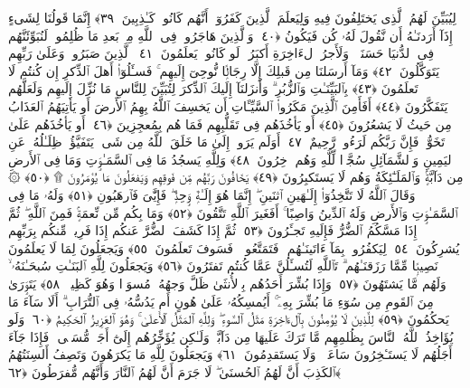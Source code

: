  لِيُبَيِّنَ لَهُمُ ٱلَّذِى يَختَلِفُونَ فِيهِ وَلِيَعلَمَ ٱلَّذِينَ كَفَرُوٓا۟ أَنَّهُم كَانُوا۟ كَـٰذِبِينَ ﴿٣٩﴾
 إِنَّمَا قَولُنَا لِشَىءٍ إِذَآ أَرَدنَـٰهُ أَن نَّقُولَ لَهُۥ كُن فَيَكُونُ ﴿٤٠﴾
 وَٱلَّذِينَ هَاجَرُوا۟ فِى ٱللَّهِ مِنۢ بَعدِ مَا ظُلِمُوا۟ لَنُبَوِّئَنَّهُم فِى ٱلدُّنيَا حَسَنَةًۭ ۖ وَلَأَجرُ ٱلءَاخِرَةِ أَكبَرُ ۚ لَو كَانُوا۟ يَعلَمُونَ ﴿٤١﴾
 ٱلَّذِينَ صَبَرُوا۟ وَعَلَىٰ رَبِّهِم يَتَوَكَّلُونَ ﴿٤٢﴾
 وَمَآ أَرسَلنَا مِن قَبلِكَ إِلَّا رِجَالًۭا نُّوحِىٓ إِلَيهِم ۚ فَسـَٔلُوٓا۟ أَهلَ ٱلذِّكرِ إِن كُنتُم لَا تَعلَمُونَ ﴿٤٣﴾
 بِٱلبَيِّنَـٰتِ وَٱلزُّبُرِ ۗ وَأَنزَلنَآ إِلَيكَ ٱلذِّكرَ لِتُبَيِّنَ لِلنَّاسِ مَا نُزِّلَ إِلَيهِم وَلَعَلَّهُم يَتَفَكَّرُونَ ﴿٤٤﴾
 أَفَأَمِنَ ٱلَّذِينَ مَكَرُوا۟ ٱلسَّيِّـَٔاتِ أَن يَخسِفَ ٱللَّهُ بِهِمُ ٱلأَرضَ أَو يَأتِيَهُمُ ٱلعَذَابُ مِن حَيثُ لَا يَشعُرُونَ ﴿٤٥﴾
 أَو يَأخُذَهُم فِى تَقَلُّبِهِم فَمَا هُم بِمُعجِزِينَ ﴿٤٦﴾
 أَو يَأخُذَهُم عَلَىٰ تَخَوُّفٍۢ فَإِنَّ رَبَّكُم لَرَءُوفٌۭ رَّحِيمٌ ﴿٤٧﴾
 أَوَلَم يَرَوا۟ إِلَىٰ مَا خَلَقَ ٱللَّهُ مِن شَىءٍۢ يَتَفَيَّؤُا۟ ظِلَـٰلُهُۥ عَنِ ٱليَمِينِ وَٱلشَّمَآئِلِ سُجَّدًۭا لِّلَّهِ وَهُم دَٟخِرُونَ ﴿٤٨﴾
 وَلِلَّهِ يَسجُدُ مَا فِى ٱلسَّمَـٰوَٟتِ وَمَا فِى ٱلأَرضِ مِن دَآبَّةٍۢ وَٱلمَلَـٰٓئِكَةُ وَهُم لَا يَستَكبِرُونَ ﴿٤٩﴾
 يَخَافُونَ رَبَّهُم مِّن فَوقِهِم وَيَفعَلُونَ مَا يُؤمَرُونَ ۩ ﴿٥٠﴾
 ۞ وَقَالَ ٱللَّهُ لَا تَتَّخِذُوٓا۟ إِلَـٰهَينِ ٱثنَينِ ۖ إِنَّمَا هُوَ إِلَـٰهٌۭ وَٟحِدٌۭ ۖ فَإِيَّٰىَ فَٱرهَبُونِ ﴿٥١﴾
 وَلَهُۥ مَا فِى ٱلسَّمَـٰوَٟتِ وَٱلأَرضِ وَلَهُ ٱلدِّينُ وَاصِبًا ۚ أَفَغَيرَ ٱللَّهِ تَتَّقُونَ ﴿٥٢﴾
 وَمَا بِكُم مِّن نِّعمَةٍۢ فَمِنَ ٱللَّهِ ۖ ثُمَّ إِذَا مَسَّكُمُ ٱلضُّرُّ فَإِلَيهِ تَجـَٔرُونَ ﴿٥٣﴾
 ثُمَّ إِذَا كَشَفَ ٱلضُّرَّ عَنكُم إِذَا فَرِيقٌۭ مِّنكُم بِرَبِّهِم يُشرِكُونَ ﴿٥٤﴾
 لِيَكفُرُوا۟ بِمَآ ءَاتَينَـٰهُم ۚ فَتَمَتَّعُوا۟ ۖ فَسَوفَ تَعلَمُونَ ﴿٥٥﴾
 وَيَجعَلُونَ لِمَا لَا يَعلَمُونَ نَصِيبًۭا مِّمَّا رَزَقنَـٰهُم ۗ تَٱللَّهِ لَتُسـَٔلُنَّ عَمَّا كُنتُم تَفتَرُونَ ﴿٥٦﴾
 وَيَجعَلُونَ لِلَّهِ ٱلبَنَـٰتِ سُبحَـٰنَهُۥ ۙ وَلَهُم مَّا يَشتَهُونَ ﴿٥٧﴾
 وَإِذَا بُشِّرَ أَحَدُهُم بِٱلأُنثَىٰ ظَلَّ وَجهُهُۥ مُسوَدًّۭا وَهُوَ كَظِيمٌۭ ﴿٥٨﴾
 يَتَوَٟرَىٰ مِنَ ٱلقَومِ مِن سُوٓءِ مَا بُشِّرَ بِهِۦٓ ۚ أَيُمسِكُهُۥ عَلَىٰ هُونٍ أَم يَدُسُّهُۥ فِى ٱلتُّرَابِ ۗ أَلَا سَآءَ مَا يَحكُمُونَ ﴿٥٩﴾
 لِلَّذِينَ لَا يُؤمِنُونَ بِٱلءَاخِرَةِ مَثَلُ ٱلسَّوءِ ۖ وَلِلَّهِ ٱلمَثَلُ ٱلأَعلَىٰ ۚ وَهُوَ ٱلعَزِيزُ ٱلحَكِيمُ ﴿٦٠﴾
 وَلَو يُؤَاخِذُ ٱللَّهُ ٱلنَّاسَ بِظُلمِهِم مَّا تَرَكَ عَلَيهَا مِن دَآبَّةٍۢ وَلَـٰكِن يُؤَخِّرُهُم إِلَىٰٓ أَجَلٍۢ مُّسَمًّۭى ۖ فَإِذَا جَآءَ أَجَلُهُم لَا يَستَـٔخِرُونَ سَاعَةًۭ ۖ وَلَا يَستَقدِمُونَ ﴿٦١﴾
 وَيَجعَلُونَ لِلَّهِ مَا يَكرَهُونَ وَتَصِفُ أَلسِنَتُهُمُ ٱلكَذِبَ أَنَّ لَهُمُ ٱلحُسنَىٰ ۖ لَا جَرَمَ أَنَّ لَهُمُ ٱلنَّارَ وَأَنَّهُم مُّفرَطُونَ ﴿٦٢﴾
